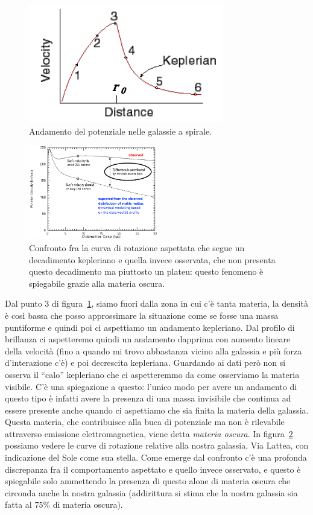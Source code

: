 \begin{figure}[htb]
    \centering
    \includegraphics[width = 0.4 \textwidth]{immagini/potenziale-galassie-a-spirale.png}
    \caption{Andamento del potenziale nelle galassie a spirale.}
    \label{fig:potenziale-galassie-a-spirale}
\end{figure}

\begin{figure}[htb]
    \centering
    \includegraphics[width= 0.5\textwidth]{immagini/confronto-curve-di-rotazione.png}
    \caption{Confronto fra la curva di rotazione aspettata che segue un decadimento kepleriano e quella invece osservata, che non presenta questo decadimento ma piuttosto un plateu: questo fenomeno è spiegabile grazie alla materia oscura.}
    \label{fig:confronto-curve-di-rotazione}
\end{figure}

Dal punto 3 di figura~\ref{fig:potenziale-galassie-a-spirale}, siamo fuori dalla zona in cui c’è tanta materia, la densità è così bassa che posso approssimare la situazione come se fosse una massa puntiforme e quindi poi ci aspettiamo un andamento kepleriano. Dal profilo di brillanza ci aspetteremo quindi un andamento dapprima con aumento lineare della velocità (fino a quando mi trovo abbastanza vicino alla galassia e più forza d'interazione c'è) e poi decrescita kepleriana. Guardando ai dati però non si osserva il “calo” kepleriano che ci aspetteremmo da come osserviamo la materia visibile. C'è una spiegazione a questo: l'unico modo per avere un andamento di questo tipo è infatti avere la presenza di una massa invisibile che continua ad essere presente anche quando ci aspettiamo che sia finita la materia della galassia. Questa materia, che contribuisce alla buca di potenziale ma non è rilevabile attraverso emissione elettromagnetica, viene detta \emph{materia oscura}. In figura~\ref{fig:confronto-curve-di-rotazione} possiamo vedere le curve di rotazione relative alla nostra galassia, Via Lattea, con indicazione del Sole come sua stella. Come emerge dal confronto c'è una profonda discrepanza fra il comportamento aspettato e quello invece osservato, e questo è spiegabile solo ammettendo la presenza di questo alone di materia oscura che circonda anche la nostra galassia (addirittura si stima che la nostra galassia sia fatta al 75\% di materia oscura).

